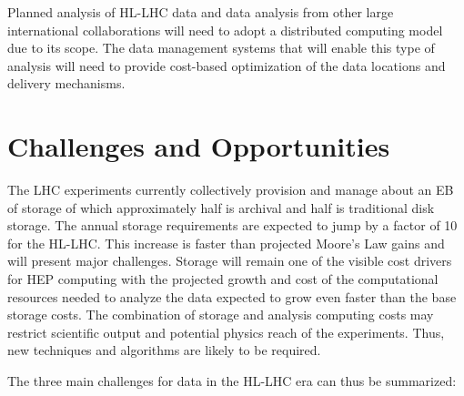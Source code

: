 \documentclass[12pt,a4paper]{article}
\begin{document}
Planned analysis of HL-LHC data and data analysis from other large
%
%
international collaborations will need to adopt a distributed computing
model due to its scope. The data management systems that will enable
this type of analysis will need to provide cost-based optimization of
the data locations and delivery mechanisms.

\section{Challenges and
Opportunities}\label{challenges-and-opportunities}

The LHC experiments currently collectively provision and manage about an EB of
storage of which approximately half is archival and half is
traditional disk storage. The annual storage requirements are expected
to jump by a factor of 10 for the HL-LHC. This increase is faster than
projected Moore's Law gains and will present major challenges. Storage
%
%
will remain one of the visible cost drivers for HEP computing with
the projected growth and cost of the computational resources needed to
analyze the data expected to grow even faster than the base
storage costs. The combination of storage and analysis computing costs
may restrict scientific output and potential physics reach of the
experiments. Thus, new techniques and algorithms are likely to be
required.

The three main challenges for data in the HL-LHC era can thus be
summarized:
\end{document}

